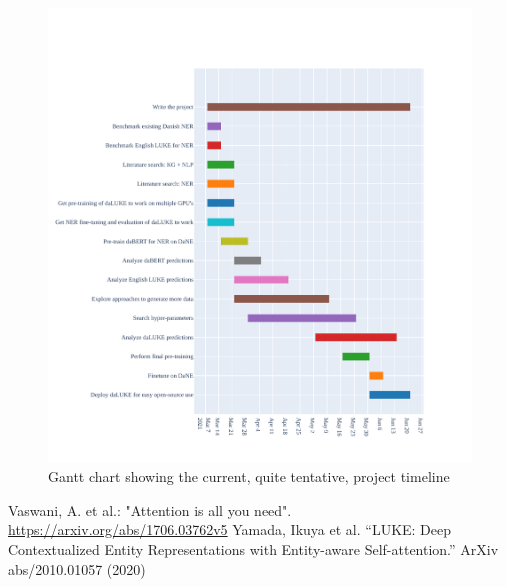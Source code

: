 \documentclass[12pt,fleqn]{article}
\begin{document}
\begin{figure}[H]
    \centering
        \includegraphics[width=\linewidth]{gantt}
        \caption{Gantt chart showing the current, quite tentative, project timeline}
    \label{fig:gantt}
\end{figure}\noindent

\begin{thebibliography}{9}
     Vaswani, A. et al.: "Attention is all you need". \url{https://arxiv.org/abs/1706.03762v5}
     Yamada, Ikuya et al. “LUKE: Deep Contextualized Entity Representations with Entity-aware Self-attention.” ArXiv abs/2010.01057 (2020)

\end{thebibliography}
\end{document}
